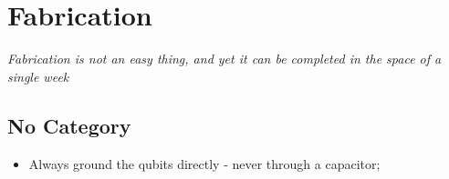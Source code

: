 
\section{Fabrication}
\label{sec:fabrication}

\textit{Fabrication is not  an easy thing, and yet it  can be completed
  in the space of a single week}

\subsection{No Category}
\label{sec:no-category}

\begin{framed}\noindent
  \begin{itemize}
  \item Always ground the qubits directly - never through a capacitor;
  \end{itemize}
\end{framed}

